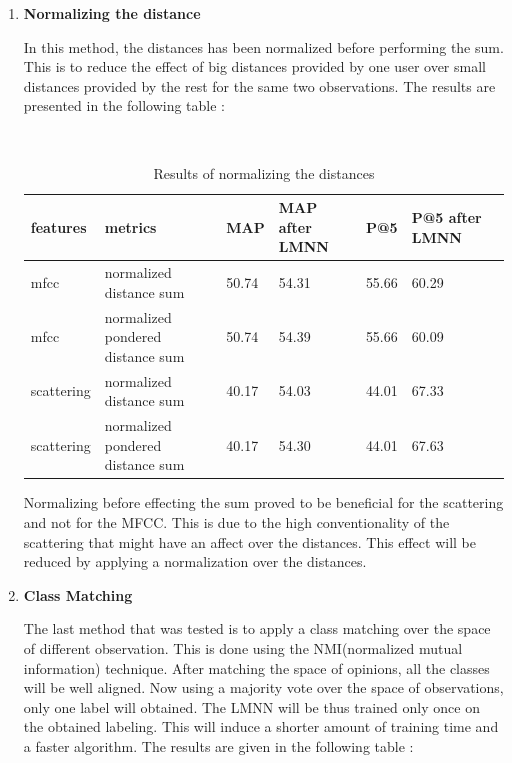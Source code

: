 \documentclass[hidelinks,12pt]{report}
\begin{document}
\begin{enumerate}
\item \textbf{Normalizing the distance}\par 
In this method, the distances has been normalized before performing the sum. This is to reduce the effect of big distances provided by one user over small distances provided by the rest for the same two observations. The results are presented in the following table :
\begin{table} [H]
\begin{center} 
\ 
 \setlength{\tabcolsep}{.16667em} 
\begin{tabular}{ | l | l | l | l | l | l | l |}
\hline
features & metrics & MAP & MAP after LMNN & P@5 & P@5 after LMNN  \\ 
\hline 
mfcc & normalized distance sum & 50.74 & 54.31 & 55.66 & 60.29  \\ 
mfcc & normalized pondered distance sum &50.74 & 54.39 & 55.66 & 60.09  \\ 
scattering & normalized distance sum & 40.17 & 54.03 & 44.01 & 67.33  \\ 
scattering & normalized pondered distance sum  & 40.17 & 54.30 & 44.01 & 67.63 \\ 
\hline
\end{tabular} 
\end{center} 
\caption{Results of normalizing the distances} 
\label{you} 
\end{table}  
 Normalizing before effecting the sum proved to be beneficial for the scattering and not for the MFCC. This is due to the high conventionality of the scattering that might have an affect over the distances. This effect will be reduced by applying a normalization over the distances.
 \item \textbf{Class Matching} \par 
 The last method that was tested is to apply a class matching over the space of different observation. This is done using the NMI(normalized mutual information) technique. After matching the space of opinions, all the classes will be well aligned. Now using a majority vote over the space of observations, only one label will obtained. The LMNN will be thus trained only once on the obtained labeling. This will induce a shorter amount of training time and a faster algorithm. The results are given in the following table : 
 \begin{table}[H] 
\begin{center} 
\ 
 \setlength{\tabcolsep}{.16667em} 
\begin{tabular}{ | l | l | l | l | l | l |}

\end{tabular}
\end{center}
\end{table}
\end{enumerate}
\end{document}
